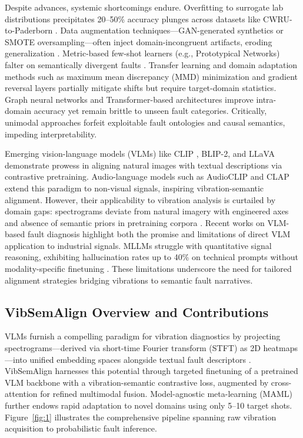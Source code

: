 Despite advances, systemic shortcomings endure. Overfitting to surrogate lab distributions precipitates 20--50\% accuracy plunges across datasets like CWRU-to-Paderborn \cite{cite17}. Data augmentation techniques—GAN-generated synthetics or SMOTE oversampling—often inject domain-incongruent artifacts, eroding generalization \cite{cite18}. Metric-based few-shot learners (e.g., Prototypical Networks) falter on semantically divergent faults \cite{cite19}. Transfer learning and domain adaptation methods such as maximum mean discrepancy (MMD) minimization \cite{li2021mmd} and gradient reversal layers \cite{ganin2016domain} partially mitigate shifts but require target-domain statistics. Graph neural networks \cite{li2023gnn} and Transformer-based architectures \cite{vaswani2017attention}\cite{li2022transformer} improve intra-domain accuracy yet remain brittle to unseen fault categories. Critically, unimodal approaches forfeit exploitable fault ontologies and causal semantics, impeding interpretability.

Emerging vision-language models (VLMs) like CLIP \cite{radford2021clip}, BLIP-2, and LLaVA \cite{liu2023llava} demonstrate prowess in aligning natural images with textual descriptions via contrastive pretraining. Audio-language models such as AudioCLIP \cite{guzhov2022audioclip} and CLAP \cite{elizalde2023clap} extend this paradigm to non-visual signals, inspiring vibration-semantic alignment. However, their applicability to vibration analysis is curtailed by domain gaps: spectrograms deviate from natural imagery with engineered axes and absence of semantic priors in pretraining corpora \cite{cite27}\cite{cite28}. Recent works on VLM-based fault diagnosis \cite{liu2024faultgpt}\cite{zhang2024mmfault,li2024llm4fd} highlight both the promise and limitations of direct VLM application to industrial signals. MLLMs struggle with quantitative signal reasoning, exhibiting hallucination rates up to 40\% on technical prompts without modality-specific finetuning \cite{cite29}. These limitations underscore the need for tailored alignment strategies bridging vibrations to semantic fault narratives.

\subsection{VibSemAlign Overview and Contributions}

VLMs furnish a compelling paradigm for vibration diagnostics by projecting spectrograms—derived via short-time Fourier transform (STFT) as 2D heatmaps—into unified embedding spaces alongside textual fault descriptors \cite{cite20}\cite{cite21}. VibSemAlign harnesses this potential through targeted finetuning of a pretrained VLM backbone with a vibration-semantic contrastive loss, augmented by cross-attention for refined multimodal fusion. Model-agnostic meta-learning (MAML) further endows rapid adaptation to novel domains using only 5--10 target shots. Figure~\ref{fig:1} illustrates the comprehensive pipeline spanning raw vibration acquisition to probabilistic fault inference.

